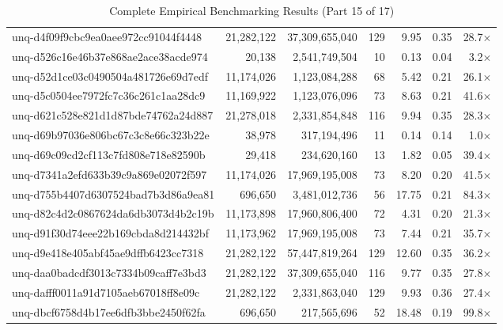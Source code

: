 \begin{table}[h!]
\begin{tabular}{lrrrrrr}
unq-d4f09f9cbc9ea0aee972cc91044f4448 & 21,282,122 & 37,309,655,040 & 129 & 9.95 & 0.35 & 28.7$\times$ \\
unq-d526c16e46b37e868ae2ace38acde974 & 20,138 & 2,541,749,504 & 10 & 0.13 & 0.04 & 3.2$\times$ \\
unq-d52d1ce03c0490504a481726e69d7edf & 11,174,026 & 1,123,084,288 & 68 & 5.42 & 0.21 & 26.1$\times$ \\
unq-d5c0504ee7972fc7c36c261c1aa28dc9 & 11,169,922 & 1,123,076,096 & 73 & 8.63 & 0.21 & 41.6$\times$ \\
unq-d621c528e821d1d87bde74762a24d887 & 21,278,018 & 2,331,854,848 & 116 & 9.94 & 0.35 & 28.3$\times$ \\
unq-d69b97036e806bc67c3c8e66c323b22e & 38,978 & 317,194,496 & 11 & 0.14 & 0.14 & 1.0$\times$ \\
unq-d69c09cd2cf113c7fd808e718e82590b & 29,418 & 234,620,160 & 13 & 1.82 & 0.05 & 39.4$\times$ \\
unq-d7341a2efd633b39c9a869e02072f597 & 11,174,026 & 17,969,195,008 & 73 & 8.20 & 0.20 & 41.5$\times$ \\
unq-d755b4407d6307524bad7b3d86a9ea81 & 696,650 & 3,481,012,736 & 56 & 17.75 & 0.21 & 84.3$\times$ \\
unq-d82c4d2c0867624da6db3073d4b2c19b & 11,173,898 & 17,960,806,400 & 72 & 4.31 & 0.20 & 21.3$\times$ \\
unq-d91f30d74eee22b169cbda8d214432bf & 11,173,962 & 17,969,195,008 & 73 & 7.44 & 0.21 & 35.7$\times$ \\
unq-d9e418e405abf45ae9dffb6423cc7318 & 21,282,122 & 57,447,819,264 & 129 & 12.60 & 0.35 & 36.2$\times$ \\
unq-daa0badcdf3013c7334b09caff7e3bd3 & 21,282,122 & 37,309,655,040 & 116 & 9.77 & 0.35 & 27.8$\times$ \\
unq-dafff0011a91d7105aeb67018ff8e09c & 21,282,122 & 2,331,863,040 & 129 & 9.93 & 0.36 & 27.4$\times$ \\
unq-dbcf6758d4b17ee6dfb3bbe2450f62fa & 696,650 & 217,565,696 & 52 & 18.48 & 0.19 & 99.8$\times$ \\
\bottomrule
\end{tabular}
\caption{Complete Empirical Benchmarking Results (Part 15 of 17)}
\end{table}

\clearpage

